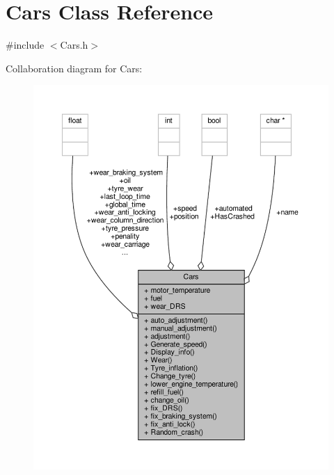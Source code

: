 \hypertarget{class_cars}{}\section{Cars Class Reference}
\label{class_cars}


{\ttfamily \#include $<$Cars.\+h$>$}



Collaboration diagram for Cars\+:
\nopagebreak
\begin{figure}[H]
\begin{center}
\leavevmode
\includegraphics[width=350pt]{class_cars__coll__graph}
\end{center}
\end{figure}
